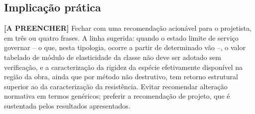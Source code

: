 \subsection*{Implicação prática}

\begin{fillblock}
\noindent\textbf{[A PREENCHER]} Fechar com uma recomendação acionável para o projetista, em três ou quatro frases. A linha sugerida: quando o estado limite de serviço governar -- o que, nesta tipologia, ocorre a partir de determinado vão --, o valor tabelado de módulo de elasticidade da classe não deve ser adotado sem verificação, e a caracterização da rigidez da espécie efetivamente disponível na região da obra, ainda que por método não destrutivo, tem retorno estrutural superior ao da caracterização da resistência. Evitar recomendar alteração normativa em termos genéricos; preferir a recomendação de projeto, que é sustentada pelos resultados apresentados.
\end{fillblock}
